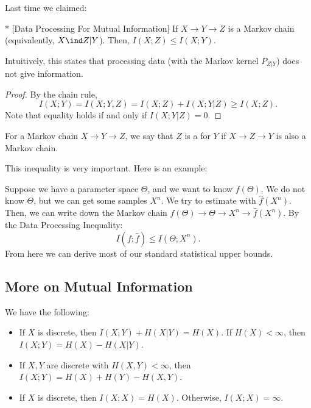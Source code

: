Last time we claimed:

\begin{fact}*
	[Data Processing For Mutual Information]
	If $X\to Y \to Z$ is a Markov chain (equivalently, $X\ind Z|Y$). Then, $I(X;Z) \leq I(X;Y)$. 
\end{fact}

Intuitively, this states that processing data (with the Markov kernel $P_{Z|Y}$) does not give information.

\begin{proof}
	By the chain rule, \[
		I(X;Y) = I(X;Y,Z) = I(X;Z) + I(X;Y|Z) \geq I(X;Z).
	\]
	Note that equality holds if and only if $I(X;Y|Z) = 0$.
\end{proof}

\begin{defn}
	For a Markov chain $X\to Y\to Z$, we say that $Z$ is a  for $Y$ if $X\to Z\to Y$ is also a Markov chain.
\end{defn}

This inequality is very important. Here is an example:

\begin{exm}
	Suppose we have a parameter space $\Theta$, and we want to know $f(\Theta)$. We do not know $\Theta$, but we can get some samples $X^n$.
	We try to estimate with $\hat f(X^n)$. Then, we can write down the Markov chain $f(\Theta)\to \Theta \to X^n \to \hat f(X^n)$. 
	By the Data Processing Inequality: \[
		I(f;\hat f) \leq I(\Theta; X^n).
	\]
	From here we can derive most of our standard statistical upper bounds.
\end{exm}

\subsection{More on Mutual Information}

\begin{thm}
	We have the following:
	\begin{itemize}
		\item If $X$ is discrete, then $I(X;Y) + H(X|Y) = H(X)$. If $H(X) <\infty$, then $I(X;Y) = H(X) - H(X|Y)$.
		\item If $X,Y$ are discrete with $H(X,Y) < \infty$, then $I(X;Y) = H(X) + H(Y) - H(X,Y)$.
		\item If $X$ is discrete, then $I(X;X) = H(X)$. Otherwise, $I(X;X) = \infty$.
	\end{itemize}
\end{thm}

